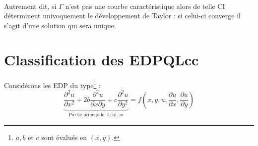 \documentclass[british,french,11pt, a4paper, openany]{book}
\begin{document}
			 \ \\
			Autrement dit, si $\Gamma$ n'est pas une courbe caractéristique alors de telle CI déterminent univoquement le développement de Taylor : si celui-ci converge il s'agit d'une solution qui sera unique.
																
			\newpage
			\section{Classification des EDPQLcc}
			Considérons les EDP du type\footnote{$a,b$ et $c$ sont évalués en $(x,y)$.} :
			\begin{equation}
				\underbrace{\frac{\partial^2u}{\partial x^2} + 2b\frac{\partial^2u}{\partial x\partial y} + c\frac{\partial^2u}{\partial y^2}}_{\text{Partie principale, L(u) :=}} = f\left(x,y,u,\frac{\partial u}{\partial x}, \frac{\partial u}{\partial y}\right)
			\end{equation}
																
\end{document}
